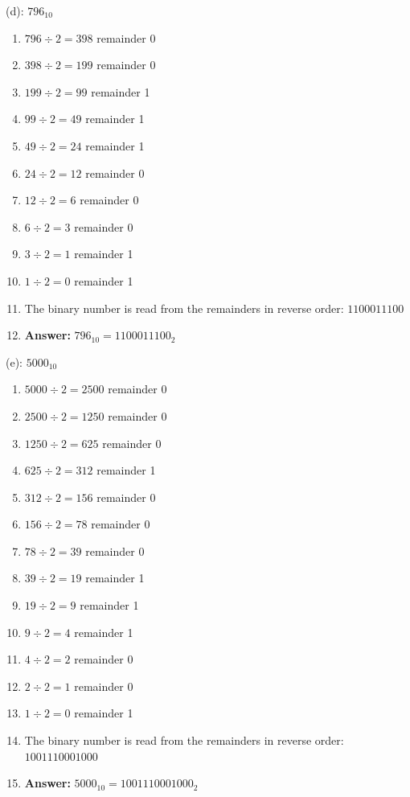 \documentclass{article}
\begin{document}
\vspace*{0.5cm}

\noindent (d): $796_{10}$

\begin{enumerate}
    \item $796 \div 2 = 398$ remainder 0
    \item $398 \div 2 = 199$ remainder 0
    \item $199 \div 2 = 99$ remainder 1
    \item $99 \div 2 = 49$ remainder 1
    \item $49 \div 2 = 24$ remainder 1
    \item $24 \div 2 = 12$ remainder 0
    \item $12 \div 2 = 6$ remainder 0
    \item $6 \div 2 = 3$ remainder 0
    \item $3 \div 2 = 1$ remainder 1
    \item $1 \div 2 = 0$ remainder 1
    \item The binary number is read from the remainders in reverse order: $1100011100$
    \item \textbf{Answer:} $796_{10} = 1100011100_2$
\end{enumerate}

\vspace*{0.5cm}

\noindent (e): $5000_{10}$

\begin{enumerate}
    \item $5000 \div 2 = 2500$ remainder 0
    \item $2500 \div 2 = 1250$ remainder 0
    \item $1250 \div 2 = 625$ remainder 0
    \item $625 \div 2 = 312$ remainder 1
    \item $312 \div 2 = 156$ remainder 0
    \item $156 \div 2 = 78$ remainder 0
    \item $78 \div 2 = 39$ remainder 0
    \item $39 \div 2 = 19$ remainder 1
    \item $19 \div 2 = 9$ remainder 1
    \item $9 \div 2 = 4$ remainder 1
    \item $4 \div 2 = 2$ remainder 0
    \item $2 \div 2 = 1$ remainder 0
    \item $1 \div 2 = 0$ remainder 1
    \item The binary number is read from the remainders in reverse order: $1001110001000$
    \item \textbf{Answer:} $5000_{10} = 1001110001000_2$
\end{enumerate}
\end{document}
